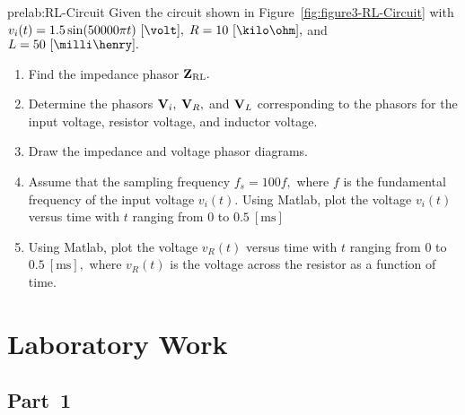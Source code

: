 \begin{prelab}{prelab:RL-Circuit}
Given the circuit shown in Figure~\ref{fig:figure3-RL-Circuit} with $v_i(t) = 1.5\sin(50000\pi t)~[\volt],$ $R = 10~[\kilo\ohm],$ and $L = 50~[\milli\henry].$ 
      \begin{enumerate}
        \item Find the impedance phasor ${\bf Z}_{\text{RL}}.$
        \item Determine the phasors ${\bf V}_i,$ ${\bf V}_R,$ and ${\bf V}_L$ corresponding to the phasors for the input voltage,  resistor voltage,  and inductor voltage.
          
        \item Draw the impedance and voltage phasor diagrams.
          
        \item Assume that  the sampling frequency $f_s = 100f,$ where $f$ is the fundamental frequency of the input voltage $v_i(t).$ Using Matlab, plot the voltage $v_i(t)$ versus time with $t$ ranging from $0$ to $0.5~[\si{\milli\second}]$
          
        \item Using Matlab, plot the voltage $v_R(t)$ versus time with $t$ ranging from $0$ to $0.5~[\si{\milli\second}],$ where $v_R(t)$ is the voltage across the resistor as a function of time.  
        \end{enumerate}  
\end{prelab}


\section{Laboratory Work}

\subsection{Part~1}
\label{sec:part1}


